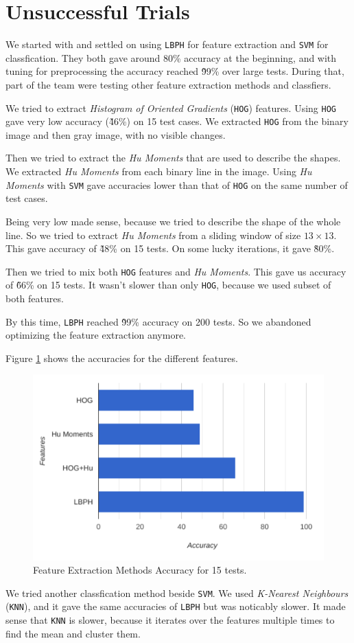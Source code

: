 \section{Unsuccessful Trials}
We started with and settled on using \texttt{LBPH} for feature extraction and \texttt{SVM} for classfication.
They both gave around 80\% accuracy at the beginning, and with tuning for preprocessing the accuracy reached \~99\% over large tests.
During that, part of the team were testing other feature extraction methods and classfiers.

We tried to extract \emph{Histogram of Oriented Gradients} (\texttt{HOG}) features.
Using \texttt{HOG} gave very low accuracy (\~46\%) on 15 test cases.
We extracted \texttt{HOG} from the binary image and then gray image, with no visible changes.

Then we tried to extract the \emph{Hu Moments} that are used to describe the shapes.
We extracted \emph{Hu Moments} from each binary line in the image.
Using \emph{Hu Moments} with \texttt{SVM} gave accuracies lower than that of \texttt{HOG} on the same number of test cases.

Being very low made sense, because we tried to describe the shape of the whole line.
So we tried to extract \emph{Hu Moments} from a sliding window of size $13\times13$.
This gave accuracy of \~48\% on 15 tests.
On some lucky iterations, it gave \~80\%.

Then we tried to mix both \texttt{HOG} features and \emph{Hu Moments}.
This gave us accuracy of \~66\% on 15 tests.
It wasn't slower than only \texttt{HOG}, because we used subset of both features.

By this time, \texttt{LBPH} reached \~99\% accuracy on 200 tests.
So we abandoned optimizing the feature extraction anymore.

Figure \ref{fig:unsuccBar} shows the accuracies for the different features.

\begin{figure}
    \centering
    \includegraphics[width=0.9\linewidth]{../figures/unsuccBar.png}
    \caption{Feature Extraction Methods Accuracy for 15 tests.}
    \label{fig:unsuccBar}
\end{figure}

We tried another classfication method beside \texttt{SVM}.
We used \emph{K-Nearest Neighbours} (\texttt{KNN}), and it gave the same accuracies of \texttt{LBPH} but was noticably slower.
It made sense that \texttt{KNN} is slower, because it iterates over the features multiple times to find the mean and cluster them.
